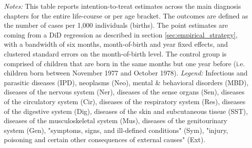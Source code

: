 \documentclass[11pt, a4paper]{article} %
\begin{document}
\begin{table}[H]
\begin{threeparttable}
{\begin{tabular}{l*{5}{c}}
				\bottomrule 
		\end{tabular}}
	\end{threeparttable} 
	\begin{minipage}{0.95\linewidth}
		\scriptsize \emph{Notes:} This table reports intention-to-treat estimates across the main diagnosis chapters for the entire life-course or per age bracket. The outcomes are defined as the number of cases per 1,000 individuals (births). The point estimates are coming from a DiD regression as described in section \ref{sec:empirical_strategy}, with a bandwidth of six months, month-of-birth and year fixed effects, and clustered standard errors on the month-of-birth level. The control group is comprised of children that are born in the same months but one year before (i.e. children born between November 1977 and October 1978).\newline
		\emph{Legend:} Infectious and parasitic diseases (IPD), neoplasms (Neo), mental \& behavioral disorders (MBD), diseases of the nervous system (Ner), diseases of the sense organs (Sen), diseases of the circulatory system (Cir), diseases of the respiratory system (Res), diseases of the digestive system (Dig), diseases of the skin and subcutaneous tissue (SST), diseases of the musculoskeletal system (Mus), diseases of the genitourinary system (Gen), "symptoms, signs, and ill-defined conditions" (Sym), "injury, poisoning and certain other consequences of external causes" (Ext).
	\end{minipage}
\end{table} 
\vspace*{\fill}\clearpage 
\restoregeometry



\end{document}
